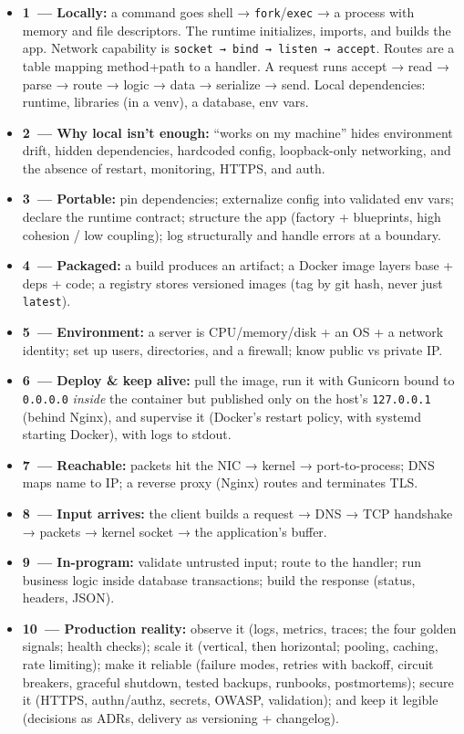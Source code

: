 \begin{itemize}
\tightlist
\item
  \textbf{1~--- Locally:} a command goes shell → \texttt{fork}/\texttt{exec} → a process with memory and file descriptors. The runtime initializes, imports, and builds the app. Network capability is \texttt{socket\ →\ bind\ →\ listen\ →\ accept}. Routes are a table mapping method+path to a handler. A request runs accept → read → parse → route → logic → data → serialize → send. Local dependencies: runtime, libraries (in a venv), a database, env vars.
\item
  \textbf{2~--- Why local isn't enough:} ``works on my machine'' hides environment drift, hidden dependencies, hardcoded config, loopback-only networking, and the absence of restart, monitoring, HTTPS, and auth.
\item
  \textbf{3~--- Portable:} pin dependencies; externalize config into validated env vars; declare the runtime contract; structure the app (factory + blueprints, high cohesion / low coupling); log structurally and handle errors at a boundary.
\item
  \textbf{4~--- Packaged:} a build produces an artifact; a Docker image layers base + deps + code; a registry stores versioned images (tag by git hash, never just \texttt{latest}).
\item
  \textbf{5~--- Environment:} a server is CPU/memory/disk + an OS + a network identity; set up users, directories, and a firewall; know public vs private IP.
\item
  \textbf{6~--- Deploy \& keep alive:} pull the image, run it with Gunicorn bound to \texttt{0.0.0.0} \emph{inside} the container but published only on the host's \texttt{127.0.0.1} (behind Nginx), and supervise it (Docker's restart policy, with systemd starting Docker), with logs to stdout.
\item
  \textbf{7~--- Reachable:} packets hit the NIC → kernel → port-to-process; DNS maps name to IP; a reverse proxy (Nginx) routes and terminates TLS.
\item
  \textbf{8~--- Input arrives:} the client builds a request → DNS → TCP handshake → packets → kernel socket → the application's buffer.
\item
  \textbf{9~--- In-program:} validate untrusted input; route to the handler; run business logic inside database transactions; build the response (status, headers, JSON).
\item
  \textbf{10~--- Production reality:} observe it (logs, metrics, traces; the four golden signals; health checks); scale it (vertical, then horizontal; pooling, caching, rate limiting); make it reliable (failure modes, retries with backoff, circuit breakers, graceful shutdown, tested backups, runbooks, postmortems); secure it (HTTPS, authn/authz, secrets, OWASP, validation); and keep it legible (decisions as ADRs, delivery as versioning + changelog).

\end{itemize}
